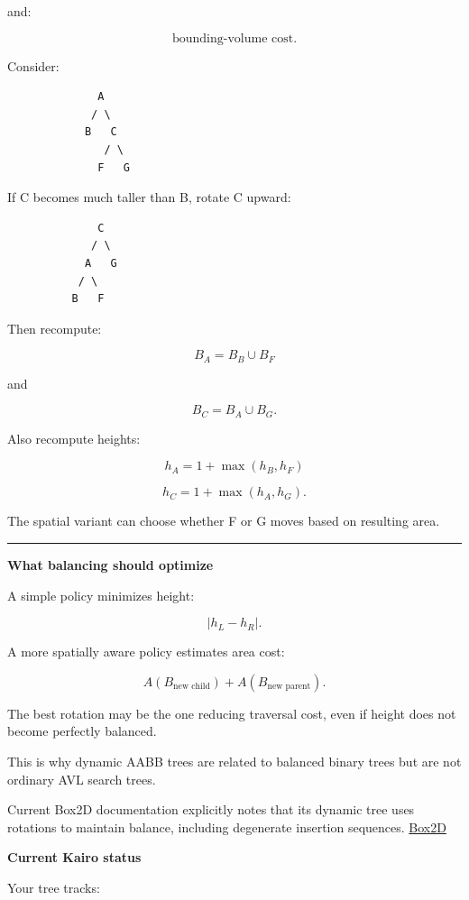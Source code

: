 and:

\[
\text{bounding-volume cost}.
\]

Consider:

\begin{verbatim}
              A
             / \
            B   C
               / \
              F   G
\end{verbatim}

If C becomes much taller than B, rotate C upward:

\begin{verbatim}
              C
             / \
            A   G
           / \
          B   F
\end{verbatim}

Then recompute:

\[
B_A=B_B\cup B_F
\]

and

\[
B_C=B_A\cup B_G.
\]

Also recompute heights:

\[
h_A=1+\max(h_B,h_F)
\]

\[
h_C=1+\max(h_A,h_G).
\]

The spatial variant can choose whether F or G moves based on resulting area.

\begin{center}\rule{0.5\linewidth}{0.5pt}\end{center}

\textbf{What balancing should optimize}

A simple policy minimizes height:

\[
|h_L-h_R|.
\]

A more spatially aware policy estimates area cost:

\[
A(B_{\text{new child}})
+
A(B_{\text{new parent}}).
\]

The best rotation may be the one reducing traversal cost, even if height does not become perfectly balanced.

This is why dynamic AABB trees are related to balanced binary trees but are not ordinary AVL search trees.

Current Box2D documentation explicitly notes that its dynamic tree uses rotations to maintain balance, including degenerate insertion sequences. \href{https://box2d.org/doc_version_2_4/md__e_1_2github_2box2d__24_2docs_2collision.html?utm_source=chatgpt.com}{Box2D}

\textbf{Current Kairo status}

Your tree tracks:

